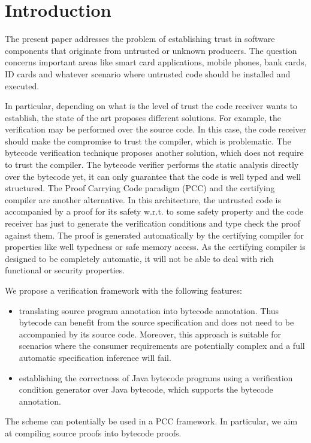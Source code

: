 
\section{Introduction}\label{intro}
The present paper addresses the  problem of establishing trust in software components that originate from untrusted or unknown producers. 
The question concerns important areas like 
smart card applications, mobile phones, bank cards, ID cards and whatever scenario where untrusted code should be installed and executed.

 In particular, depending on what is the level of trust the code receiver wants to establish, 
the state of the art proposes different solutions. 
For example, the verification may be performed over the source code. 
In this case, the code receiver should make the compromise to trust the compiler, which is problematic. 
The bytecode verification technique proposes another solution, which does not require to trust the compiler. 
The bytecode verifier performs the static analysis directly over the bytecode yet, it can only guarantee that 
the code is well typed and well structured. %
The Proof Carrying Code paradigm (PCC) and the certifying compiler \cite{Necula97,ComNec,DesNecLee98} are another alternative.
 In this architecture, the untrusted code
is accompanied by a proof for its safety w.r.t. to some safety property and the code receiver has just to generate the 
verification conditions and type check the proof against them. 
The proof is generated automatically by the certifying compiler for properties like well typedness or safe memory access. 
As the certifying compiler is designed to be completely automatic, it will not be able to deal with rich functional or security properties. 
 
We propose a verification framework with the following features:
\begin{itemize}
  \item translating source program annotation into bytecode annotation.
 Thus bytecode can benefit from the source specification and does not need to be accompanied by its source code. Moreover, 
this approach is suitable for scenarios where the consumer requirements are potentially complex and a full automatic specification inference
will fail. 
   \item establishing the correctness of Java bytecode programs using a verification condition generator over Java bytecode, which supports
the bytecode annotation.
\end{itemize}
The scheme can potentially be used in a PCC framework. In particular, we aim at compiling source proofs into bytecode proofs. 

